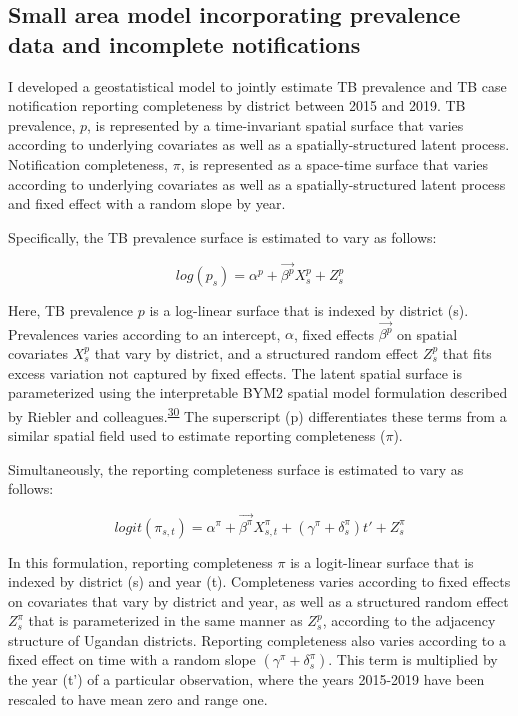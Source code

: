 \documentclass[
]{article}
\begin{document}
\hypertarget{small-area-model-incorporating-prevalence-data-and-incomplete-notifications}{%
\subsection{Small area model incorporating prevalence data and incomplete notifications}\label{small-area-model-incorporating-prevalence-data-and-incomplete-notifications}}

I developed a geostatistical model to jointly estimate TB prevalence and TB case notification reporting completeness by district between 2015 and 2019. TB prevalence, \(p\), is represented by a time-invariant spatial surface that varies according to underlying covariates as well as a spatially-structured latent process. Notification completeness, \(\pi\), is represented as a space-time surface that varies according to underlying covariates as well as a spatially-structured latent process and fixed effect with a random slope by year.

Specifically, the TB prevalence surface is estimated to vary as follows:

\[log(p_s) = \alpha^p + \overrightarrow{\beta^p}X^p_s + Z^p_s\]

Here, TB prevalence \(p\) is a log-linear surface that is indexed by district (s). Prevalences varies according to an intercept, \(\alpha\), fixed effects \(\overrightarrow{\beta^p}\) on spatial covariates \(X^p_s\) that vary by district, and a structured random effect \(Z^p_s\) that fits excess variation not captured by fixed effects. The latent spatial surface is parameterized using the interpretable BYM2 spatial model formulation described by Riebler and colleagues.\textsuperscript{\protect\hyperlink{ref-Riebler2016}{30}} The superscript (p) differentiates these terms from a similar spatial field used to estimate reporting completeness (\(\pi\)).

Simultaneously, the reporting completeness surface is estimated to vary as follows:

\[logit(\pi_{s,t}) = \alpha^\pi + \overrightarrow{\beta^\pi}X^\pi_{s,t} + (\gamma^\pi + \delta^\pi_s)t' + Z^\pi_s\]

In this formulation, reporting completeness \(\pi\) is a logit-linear surface that is indexed by district (s) and year (t). Completeness varies according to fixed effects on covariates that vary by district and year, as well as a structured random effect \(Z^\pi_s\) that is parameterized in the same manner as \(Z^p_s\), according to the adjacency structure of Ugandan districts. Reporting completeness also varies according to a fixed effect on time with a random slope \((\gamma^\pi + \delta^\pi_s)\). This term is multiplied by the year (t') of a particular observation, where the years 2015-2019 have been rescaled to have mean zero and range one.
\end{document}
